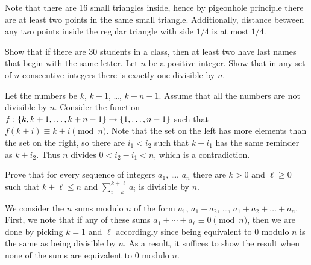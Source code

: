 \begin{chapterendexercises}
\begin{solution}
      Note that there are 16 small triangles inside, hence by pigeonhole
      principle there are at least two points in the same small triangle.
      Additionally, distance between any two points inside the regular triangle
      with side $1 / 4$ is at most $1 / 4$.
    \end{solution}
  \exercise Show that if there are 30 students in a class, then at least
    two have last names that begin with the same letter.
  \exercise[recommended] Let $n$ be a positive integer. Show that in any set of
    $n$ consecutive integers there is exactly one divisible by $n$.
    \begin{solution}
      Let the numbers be $k$, $k + 1$, \dots, $k + n - 1$. Assume that all the
      numbers are not divisible by $n$. Consider the function 
      $f: \set{k, k + 1, \dots, k + n - 1} \to \set{1, \dots, n - 1}$ such that
      $f(k + i) \equiv k + i \pmod{n}$. Note that the set on the left has more
      elements than the set on the right, so there are $i_1 < i_2$ such that 
      $k + i_1$ has the same reminder as $k + i_2$.
      Thus $n$ divides $0 < i_2 - i_1 < n$, which is a contradiction.
    \end{solution}
  \exercise[recommended] Prove that for every sequence of integers $a_1$, \dots,
    $a_n$ there are $k > 0$ and $\ell \ge 0$ such that $k + \ell \le n$ and
    $\sum_{i = k}^{k + \ell} a_i$ is divisible by $n$.
    \begin{solution}
      We consider the $n$ sums modulo $n$ of the form $a_1$, $a_1 + a_2$,
      \dots, $a_1 + a_2 + \dots + a_n$. First, we note that if any of these sums
      $a_1 + \cdots + a_\ell \equiv 0 \pmod{n}$, then we are done by picking $k
      = 1$ and $\ell$ accordingly since being equivalent to $0$ modulo $n$ is
      the same as being divisible by $n$. As a result, it suffices to show the
      result when none of the sums are equivalent to $0$ modulo $n$.


\end{solution}
\end{chapterendexercises}
